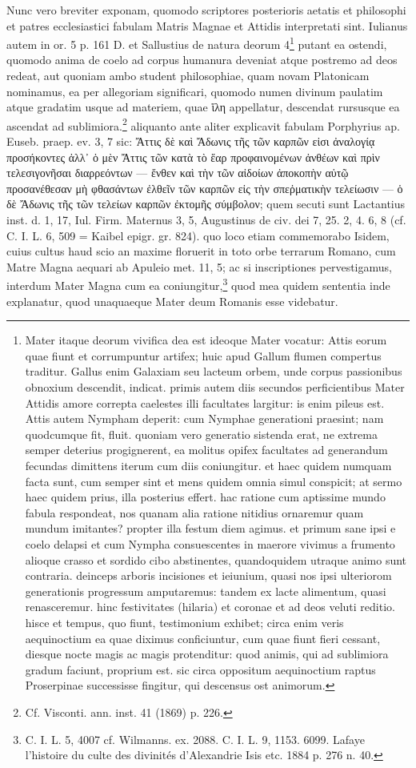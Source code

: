 \documentclass[a4paper, 11pt, oneside, polutonikogreek, german]{article}
\begin{document}
Nunc vero breviter exponam, quomodo scriptores posterioris aetatis et philosophi et patres ecclesiastici fabulam Matris Magnae et Attidis interpretati sint. Iulianus autem in or. 5 p. 161 D. et Sallustius de natura deorum 4\footnote{Mater itaque deorum vivifica dea est ideoque Mater vocatur: Attis eorum quae fiunt et corrumpuntur artifex; huic apud Gallum flumen compertus traditur. Gallus enim Galaxiam seu lacteum orbem, unde corpus passionibus obnoxium descendit, indicat. primis autem diis secundos perficientibus Mater Attidis amore correpta caelestes illi facultates largitur: is enim pileus est. Attis autem Nympham deperit: cum Nymphae generationi praesint; nam quodcumque fit, fluit. quoniam vero generatio sistenda erat, ne extrema semper deterius progignerent, ea molitus opifex facultates ad generandum fecundas dimittens iterum cum diis coniungitur. et haec quidem numquam facta sunt, cum semper sint et mens quidem omnia simul conspicit; at sermo haec quidem prius, illa posterius effert. hac ratione cum aptissime mundo fabula respondeat, nos quanam alia ratione nitidius ornaremur quam mundum imitantes? propter illa festum diem agimus. et primum sane ipsi e coelo delapsi et cum Nympha consuescentes in maerore vivimus a frumento alioque crasso et sordido cibo abstinentes, quandoquidem utraque animo sunt contraria. deinceps arboris incisiones et ieiunium, quasi nos ipsi ulteriorom generationis progressum amputaremus: tandem ex lacte alimentum, quasi renasceremur. hinc festivitates (hilaria) et coronae et ad deos veluti reditio. hisce et tempus, quo fiunt, testimonium exhibet; circa enim veris aequinoctium ea quae diximus conficiuntur, cum quae fiunt fieri cessant, diesque nocte magis ac magis protenditur: quod animis, qui ad sublimiora gradum faciunt, proprium est. sic circa oppositum aequinoctium raptus Proserpinae successisse fingitur, qui descensus ost animorum.} putant ea ostendi, quomodo anima de coelo ad corpus humanura deveniat atque postremo ad deos redeat, aut quoniam ambo student philosophiae, quam novam Platonicam nominamus, ea per allegoriam significari, quomodo numen divinum paulatim atque gradatim usque ad materiem, quae ἵλη appellatur, descendat rursusque ea ascendat ad sublimiora.\footnote{Cf. Visconti. ann. inst. 41 (1869) p. 226.} aliquanto ante aliter explicavit fabulam Porphyrius ap. Euseb. praep. ev. 3, 7 sic: Ἄττις δὲ καὶ Ἄδωνις τῆς τῶν καρπῶν εἰσι ἀναλογίᾳ προσήκοντες ἀλλ᾽ ὁ μὲν Ἄττις τῶν κατὰ τὸ ἕαρ προφαινομένων ἀνθέων καὶ πρὶν τελεσιγονῆσαι διαρρεόντων --- ἔνθεν καὶ τὴν τῶν αἰδοίων ἀποκοπὴν αὐτῷ προσανέθεσαν μὴ φθασάντων ἐλθεῖν τῶν καρπῶν εἰς τὴν σπεῥματικὴν τελείωσιν --- ὁ δὲ Ἄδωνις τῆς τῶν τελείων καρπῶν ἐκτομῆς σύμβολον; quem secuti sunt Lactantius inst. d. 1, 17, Iul. Firm. Maternus 3, 5, Augustinus de civ. dei 7, 25. 2, 4. 6, 8 (cf. C. I. L. 6, 509 = Kaibel epigr. gr. 824). quo loco etiam commemorabo Isidem, cuius cultus haud scio an maxime floruerit in toto orbe terrarum Romano, cum Matre Magna aequari ab Apuleio met. 11, 5; ac si inscriptiones pervestigamus, interdum Mater Magna cum ea coniungitur,\footnote{C. I. L. 5, 4007 cf. Wilmanns. ex. 2088. C. I. L. 9, 1153. 6099. Lafaye l'histoire du culte des divinités d'Alexandrie Isis etc. 1884 p. 276 n. 40.} quod mea quidem sententia inde explanatur, quod unaquaeque Mater deum Romanis esse videbatur.
\end{document}
